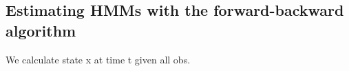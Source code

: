 
\subsection{Estimating HMMs with the forward-backward algorithm}

We calculate state x at time t given all obs.

